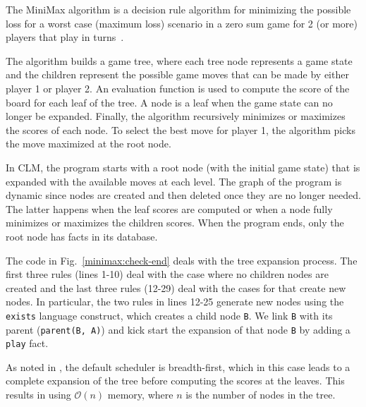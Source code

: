 The MiniMax algorithm is a decision rule algorithm for minimizing the
possible loss for a worst case (maximum loss) scenario in a zero sum
game for 2 (or more) players that play in
turns~\cite{Edwards54}.

The algorithm builds a game tree, where each tree node represents a
game state and the children represent the possible game moves that can
be made by either player 1 or player 2.  An evaluation function is
used to compute the score of the board for each leaf of the tree. A
node is a leaf when the game state can no longer be expanded. Finally,
the algorithm recursively minimizes or maximizes the scores of each
node.  To select the best move for player 1, the algorithm picks the
move maximized at the root node.

In CLM, the program starts with a root node (with the initial game state)
that is expanded with the available moves at each level. The graph of the
program is dynamic since nodes are created and then deleted once they are no
longer needed. The latter happens when the
leaf scores are computed or when a node fully minimizes or maximizes the
children scores. When the program ends, only the root node has facts in its
database.

The code in Fig.~\ref{minimax:check-end} deals with the tree expansion process.
The first three rules (lines 1-10) deal
with the case where no children nodes are created and the last three rules
(12-29) deal with the cases for that create new nodes. In particular, the two
rules in lines 12-25 generate new nodes using the
\texttt{exists} language construct, which creates a child node 
\texttt{B}. We link \texttt{B} with its parent (\texttt{parent(B, A)})
and kick start the expansion of that node \texttt{B} by adding a \texttt{play}
fact.

As noted in , the default scheduler is
breadth-first, which in this case leads to a complete expansion of the
tree before computing the scores at the leaves.  This results in using
$\mathcal{O}(n)$ memory, where $n$ is the number of nodes in the tree.

